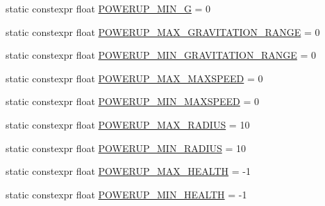 \begin{DoxyCompactItemize}
\item 
static constexpr float \hyperlink{class_act_conf_a3977a3808f719611b96014842d20435e}{P\+O\+W\+E\+R\+U\+P\+\_\+\+M\+I\+N\+\_\+\+G} = 0
\item 
static constexpr float \hyperlink{class_act_conf_ada24ed05884db1e2cdc365aa0d095cf3}{P\+O\+W\+E\+R\+U\+P\+\_\+\+M\+A\+X\+\_\+\+G\+R\+A\+V\+I\+T\+A\+T\+I\+O\+N\+\_\+\+R\+A\+N\+G\+E} = 0
\item 
static constexpr float \hyperlink{class_act_conf_afd6eeae83a436cd4d2f481c6fe58e8f4}{P\+O\+W\+E\+R\+U\+P\+\_\+\+M\+I\+N\+\_\+\+G\+R\+A\+V\+I\+T\+A\+T\+I\+O\+N\+\_\+\+R\+A\+N\+G\+E} = 0
\item 
static constexpr float \hyperlink{class_act_conf_a9390d897e9e49f32f4580e8720972d97}{P\+O\+W\+E\+R\+U\+P\+\_\+\+M\+A\+X\+\_\+\+M\+A\+X\+S\+P\+E\+E\+D} = 0
\item 
static constexpr float \hyperlink{class_act_conf_acb19e08ce7a643cb3759fd1fb973b7dc}{P\+O\+W\+E\+R\+U\+P\+\_\+\+M\+I\+N\+\_\+\+M\+A\+X\+S\+P\+E\+E\+D} = 0
\item 
static constexpr float \hyperlink{class_act_conf_a90dc6d4b99d41b4793639c2dc6bf28b1}{P\+O\+W\+E\+R\+U\+P\+\_\+\+M\+A\+X\+\_\+\+R\+A\+D\+I\+U\+S} = 10
\item 
static constexpr float \hyperlink{class_act_conf_a4bb7dd3592fa1dfdd2a39beb748fb929}{P\+O\+W\+E\+R\+U\+P\+\_\+\+M\+I\+N\+\_\+\+R\+A\+D\+I\+U\+S} = 10
\item 
static constexpr float \hyperlink{class_act_conf_acabfbbc2f54a2a6c249cfb5cc1afb2dc}{P\+O\+W\+E\+R\+U\+P\+\_\+\+M\+A\+X\+\_\+\+H\+E\+A\+L\+T\+H} = -\/1
\item 
static constexpr float \hyperlink{class_act_conf_a7faa696e27ff6cce008476fd6dcd6210}{P\+O\+W\+E\+R\+U\+P\+\_\+\+M\+I\+N\+\_\+\+H\+E\+A\+L\+T\+H} = -\/1
\end{DoxyCompactItemize}


